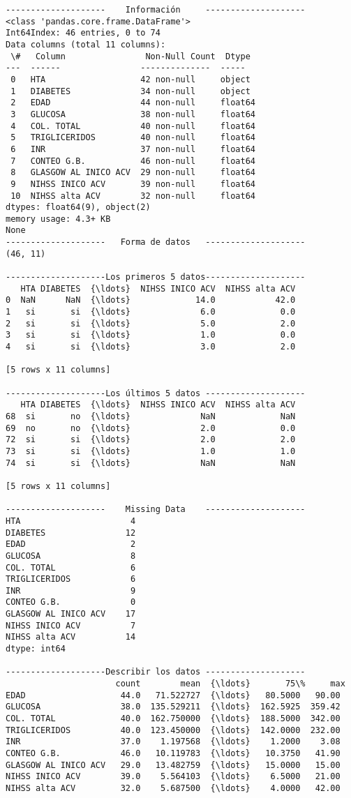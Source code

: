     \begin{Verbatim}[commandchars=\\\{\}]
--------------------    Información     --------------------
<class 'pandas.core.frame.DataFrame'>
Int64Index: 46 entries, 0 to 74
Data columns (total 11 columns):
 \#   Column                Non-Null Count  Dtype
---  ------                --------------  -----
 0   HTA                   42 non-null     object
 1   DIABETES              34 non-null     object
 2   EDAD                  44 non-null     float64
 3   GLUCOSA               38 non-null     float64
 4   COL. TOTAL            40 non-null     float64
 5   TRIGLICERIDOS         40 non-null     float64
 6   INR                   37 non-null     float64
 7   CONTEO G.B.           46 non-null     float64
 8   GLASGOW AL INICO ACV  29 non-null     float64
 9   NIHSS INICO ACV       39 non-null     float64
 10  NIHSS alta ACV        32 non-null     float64
dtypes: float64(9), object(2)
memory usage: 4.3+ KB
None
--------------------   Forma de datos   --------------------
(46, 11)

--------------------Los primeros 5 datos--------------------
   HTA DIABETES  {\ldots}  NIHSS INICO ACV  NIHSS alta ACV
0  NaN      NaN  {\ldots}             14.0            42.0
1   si       si  {\ldots}              6.0             0.0
2   si       si  {\ldots}              5.0             2.0
3   si       si  {\ldots}              1.0             0.0
4   si       si  {\ldots}              3.0             2.0

[5 rows x 11 columns]

--------------------Los últimos 5 datos --------------------
   HTA DIABETES  {\ldots}  NIHSS INICO ACV  NIHSS alta ACV
68  si       no  {\ldots}              NaN             NaN
69  no       no  {\ldots}              2.0             0.0
72  si       si  {\ldots}              2.0             2.0
73  si       si  {\ldots}              1.0             1.0
74  si       si  {\ldots}              NaN             NaN

[5 rows x 11 columns]

--------------------    Missing Data    --------------------
HTA                      4
DIABETES                12
EDAD                     2
GLUCOSA                  8
COL. TOTAL               6
TRIGLICERIDOS            6
INR                      9
CONTEO G.B.              0
GLASGOW AL INICO ACV    17
NIHSS INICO ACV          7
NIHSS alta ACV          14
dtype: int64

--------------------Describir los datos --------------------
                      count        mean  {\ldots}       75\%     max
EDAD                   44.0   71.522727  {\ldots}   80.5000   90.00
GLUCOSA                38.0  135.529211  {\ldots}  162.5925  359.42
COL. TOTAL             40.0  162.750000  {\ldots}  188.5000  342.00
TRIGLICERIDOS          40.0  123.450000  {\ldots}  142.0000  232.00
INR                    37.0    1.197568  {\ldots}    1.2000    3.08
CONTEO G.B.            46.0   10.119783  {\ldots}   10.3750   41.90
GLASGOW AL INICO ACV   29.0   13.482759  {\ldots}   15.0000   15.00
NIHSS INICO ACV        39.0    5.564103  {\ldots}    6.5000   21.00
NIHSS alta ACV         32.0    5.687500  {\ldots}    4.0000   42.00


\end{Verbatim}
